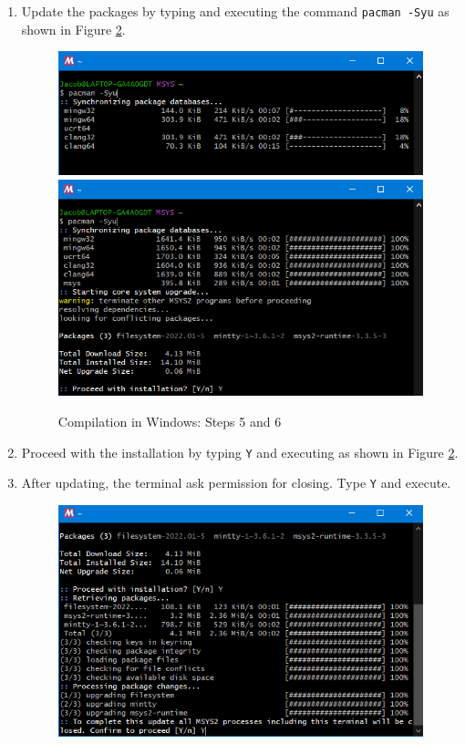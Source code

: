 \documentclass[a4paper,fleqn]{book}
\begin{document}
\begin{enumerate}
\begin{figure}[h]
  \label{fig:windows_compilation_01}
  \end{figure}
  \item Update the packages by typing and executing the command \texttt{pacman -Syu} as shown in Figure \ref{fig:windows_compilation_02}.
  \begin{figure}[h]
  \centering
  \includegraphics[scale=0.5]{figures/windows_compilation_02.png}
  \includegraphics[scale=0.5]{figures/windows_compilation_03.png}
  \caption{Compilation in Windows: Steps 5 and 6}
  \label{fig:windows_compilation_02}
  \end{figure}
  \item Proceed with the installation by typing \texttt{Y} and executing as shown in Figure \ref{fig:windows_compilation_02}.
  \item After updating, the terminal ask permission for closing. Type \texttt{Y} and execute.
  \begin{figure}[h]
  \centering
  \includegraphics[scale=0.5]{figures/windows_compilation_04.png}

\end{figure}
\end{enumerate}
\end{document}
